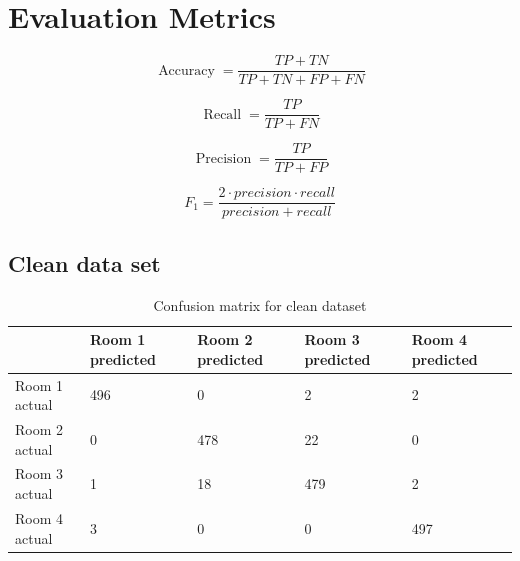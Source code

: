 \documentclass[a4paper, 11pt]{article}
\begin{document}
\pagebreak
\section{Evaluation Metrics}

    \[ \ensuremath{\operatorname{Accuracy}} = \frac{\mathit{TP} +
   \mathit{TN}}{\mathit{TP} + \mathit{TN} +
   \mathit{FP} + \mathit{FN}} \]

   \[ \ensuremath{\operatorname{Recall}} = \frac{\mathit{TP}}{\mathit{TP} +
   \mathit{FN}} \]

   \[ \ensuremath{\operatorname{Precision}} = \frac{\mathit{TP}}{\mathit{TP} +
   \mathit{FP}} \]

   \[ F_1 = \frac{2 \cdot \mathit{precision} \cdot \mathit{recall}}{\mathit{precision} + \mathit{recall}} \]

    \subsection{Clean data set}
    \renewcommand{\arraystretch}{2}
    \begin{table}[htb]
      \centering
      \begin{tabular}{|l|l|l|l|l|}
      \hline
                    & Room 1 predicted & Room 2 predicted & Room 3 predicted & Room 4 predicted \\ \hline
      Room 1 actual & 496              & 0                & 2                & 2                \\ \hline
      Room 2 actual & 0                & 478              & 22               & 0                \\ \hline
      Room 3 actual & 1                & 18               & 479              & 2                \\ \hline
      Room 4 actual & 3                & 0                & 0                & 497              \\ \hline
      \end{tabular} 
      \caption{Confusion matrix for clean dataset} \
    \end{table}
\end{document}
